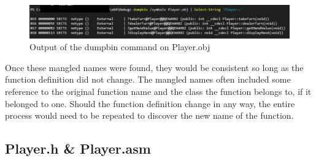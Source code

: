 \documentclass[twoside]{article}
\begin{document}
    \begin{figure}[hbtp]
        \centering
        \includegraphics[scale=4]{dumpbin}
        \caption {Output of the dumpbin command on Player.obj}
        \label{fig:Dumpbin}
    \end{figure}

    \noindent
    Once these mangled names were found, they would be consistent so long as the function definition did not change.
    The mangled names often included some reference to the original function name and the class the function belongs to, if it belonged to one.
    Should the function definition change in any way, the entire process would need to be repeated to discover the new name of the function.

    \subsection{Player.h \& Player.asm}\label{subsec:player.h-&-player.asm}

    \bigblock
\end{document}
